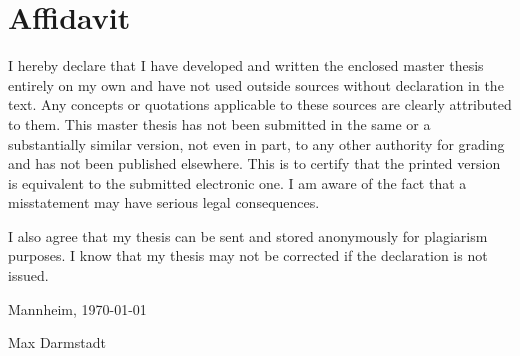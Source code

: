 \newpage

\section*{Affidavit}
{I hereby declare that I have developed and written the enclosed master thesis entirely on my own and have not used outside sources without declaration in the text. Any concepts or quotations applicable to these sources are clearly attributed to them. This master thesis has not been submitted in the same or a substantially similar version, not even in part, to any other authority for grading and has not been published elsewhere. This is to certify that the printed version is equivalent to the submitted electronic one. I am aware of the fact that a misstatement may have serious legal consequences.\par}

\vspace{0.7cm}
{I also agree that my thesis can be sent and stored anonymously for plagiarism purposes. I know that my thesis may not be corrected if the declaration is not issued.\par}
\vspace{0.7cm}


Mannheim, \today

\vspace{2.4cm}
Max Darmstadt